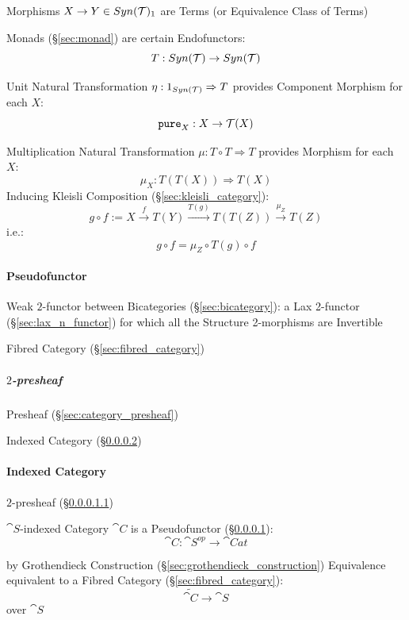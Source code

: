 Morphisms $X \rightarrow Y \in Syn(\mathcal{T})_1$ are Terms (or Equivalence
Class of Terms)

Monads (\S\ref{sec:monad}) are certain Endofunctors:
\[
  T : Syn(\mathcal{T}) \rightarrow Syn(\mathcal{T})
\]

Unit Natural Transformation $\eta : 1_{Syn(\mathcal{T})} \Rightarrow T$
provides Component Morphism for each $X$:
\[
  \mathtt{pure}_X : X \rightarrow \mathcal{T}(X)
\]

Multiplication Natural Transformation $\mu : T \circ T \Rightarrow T$
provides Morphism for each $X$:
\[
  \mu_X : T(T(X)) \Rightarrow T(X)
\]
Inducing Kleisli Composition (\S\ref{sec:kleisli_category}):
\[
  g \circ f := X \xrightarrow{f} T(Y) \xrightarrow{T(g)} T(T(Z))
  \xrightarrow{\mu_Z} T(Z)
\]
i.e.:
\[
  g \circ f = \mu_Z \circ T(g) \circ f
\]



\paragraph{Pseudofunctor}\label{sec:pseudofunctor}\hfill

Weak $2$-functor between Bicategories (\S\ref{sec:bicategory}):
a Lax 2-functor (\S\ref{sec:lax_n_functor}) for which all the Structure
2-morphisms are Invertible

Fibred Category (\S\ref{sec:fibred_category})



\subparagraph{$2$-presheaf}\label{sec:2_presheaf}\hfill

Presheaf (\S\ref{sec:category_presheaf})

Indexed Category (\S\ref{sec:indexed_category})



\paragraph{Indexed Category}\label{sec:indexed_category}\hfill

$2$-presheaf (\S\ref{sec:2_presheaf})

$\cat{S}$-indexed Category $\cat{C}$ is a Pseudofunctor
(\S\ref{sec:pseudofunctor}):
\[
  \cat{C}: \cat{S}^{op} \rightarrow \cat{Cat}
\]

by Grothendieck Construction (\S\ref{sec:grothendieck_construction})
Equivalence equivalent to a Fibred Category
(\S\ref{sec:fibred_category}):
\[
  \tilde{\cat{C}} \rightarrow \cat{S}
\]
over $\cat{S}$



